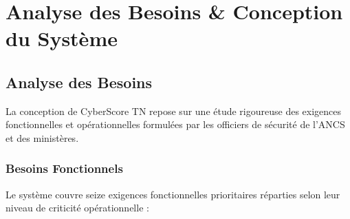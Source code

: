 \chapter[Analyse des Besoins \& Conception]{Analyse des Besoins \& Conception du Système}
\label{chap:conception}

\section{Analyse des Besoins}
La conception de CyberScore TN repose sur une étude rigoureuse des exigences fonctionnelles et opérationnelles formulées par les officiers de sécurité de l'ANCS et des ministères.

\subsection{Besoins Fonctionnels}
Le système couvre seize exigences fonctionnelles prioritaires réparties selon leur niveau de criticité opérationnelle :

